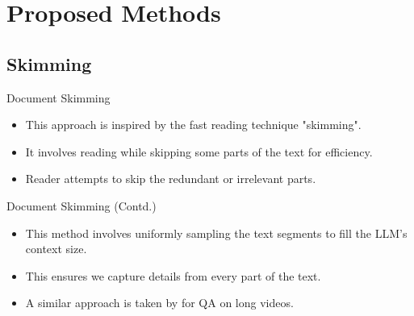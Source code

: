 \section{Proposed Methods}


\subsection{Skimming}

\begin{frame}{Document Skimming}

\begin{itemize}
  \item This approach is inspired by the fast reading technique "skimming".
  \item<2-> It involves reading while skipping some parts of the text for efficiency.
  \item<3-> Reader attempts to skip the redundant or irrelevant parts.
\end{itemize}



\end{frame}

\begin{frame}{Document Skimming (Contd.)}

\begin{itemize}
	\item This method involves uniformly sampling the text segments to fill the LLM's
	context size.
	\item This ensures we capture details from every part of the text.
	\item A similar approach is taken by \citet{wang2024videoagent} for QA on long
	videos.
\end{itemize}



\end{frame}
